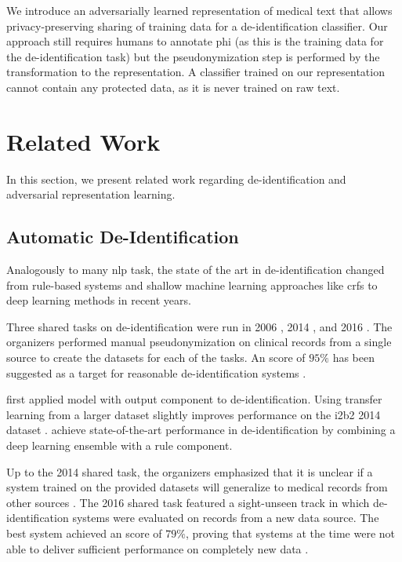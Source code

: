 %
We introduce an adversarially learned representation of medical text that allows privacy-preserving sharing of training data for a de-identification classifier.
%
Our approach still requires humans to annotate \ac{phi} (as this is the training data for the de-identification task) but the pseudonymization step is performed by the transformation to the representation.
%
A classifier trained on our representation cannot contain any protected data, as it is never trained on raw text.

\section{Related Work}\label{sec:related}
%
In this section, we present related work regarding de-identification and adversarial representation learning.

\subsection{Automatic De-Identification}
%
Analogously to many \ac{nlp} task, the state of the art in de-identification changed from rule-based systems and shallow machine learning approaches like \acp{crf} \citep{uzuner2007evaluating,meystre2010automatic} to deep learning methods \citep{stubbs2017identification, dernoncourt2017identification, liu2017identification} in recent years.

%
Three shared tasks on de-identification were run in 2006 \citep{uzuner2007evaluating}, 2014 \citep{stubbs2015automated}, and 2016 \citep{stubbs2017identification}.
%
The organizers performed manual pseudonymization on clinical records from a single source to create the datasets for each of the tasks.
%
An \fone score of $95\%$ has been suggested as a target for reasonable de-identification systems \citep{stubbs2015automated}.

%
\citet{dernoncourt2017identification} first applied  \citep{hochreiter1997long} model with  output component to de-identification.
%
Using transfer learning from a larger dataset slightly improves performance on the i2b2 2014 dataset \citep{lee2017transfer}.
%
\citet{liu2017identification} achieve state-of-the-art performance in de-identification by combining a deep learning ensemble with a rule component.

%
Up to the 2014 shared task, the organizers emphasized that it is unclear if a system trained on the provided datasets will generalize to medical records from other sources \citep{uzuner2007evaluating,stubbs2015automated}.
%
The 2016 shared task featured a sight-unseen track in which de-identification systems were evaluated on records from a new data source.
%
The best system achieved an \fone score of $79\%$, proving that systems at the time were not able to deliver sufficient performance on completely new data \citep{stubbs2017identification}.

